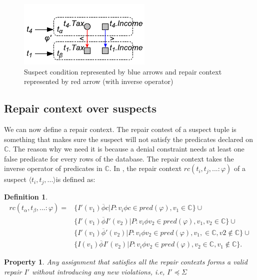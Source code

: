 \documentclass[letterpaper, 12pt]{report}
\newtheorem{mydef}{Definition}
\newtheorem{myprop}{Property}
\begin{document}
\begin{figure}
	\centering
	\includegraphics[scale=1]{img/fig3}
	\caption{\label{fig3}Suspect condition represented by blue arrows and repair context represented by red arrow (with inverse operator)}
\end{figure}

\subsection{Repair context over suspects}

We can now define a repair context. The repair contest of a suspect tuple is something that makes sure the suspect will not satisfy the predicates declared on $\mathbb{C}$. The reason why we need it is because a denial constraint needs at least one false predicate for every rows of the database. The repair context takes the inverse operator of predicates in $\mathbb{C}$. In \cite{main}, the repair context $rc(t_i,t_j,...:\varphi)$ of a suspect $\langle t_i,t_j,... \rangle $is defined as:

\begin{mydef}
	\begin{displaymath}
	\begin{split}
	rc(t_\alpha,t_\beta,...:\varphi) =
	&\{ I'(v_1)\overline{\phi}c|P : v_i\phi c \in pred(\varphi),v_1 \in \mathbb{C}\}\cup\\
	&\{I'(v_1)\overline{\phi} I'(v_2)|P : v_i\phi v_2 \in pred(\varphi),v_1,v_2 \in \mathbb{C}\}\cup\\
	&\{I'(v_1)\overline{\phi} '(v_2)|P : v_i\phi v_2 \in pred(\varphi),v_1,\in \mathbb{C},v2 \not\in \mathbb{C}\}\cup\\
	&\{I(v_1)\overline{\phi} I'(v_2)|P : v_i\phi v_2 \in pred(\varphi),v_2 \in \mathbb{C},v_1 \not\in \mathbb{C}\}.
	\end{split}
	\end{displaymath}
\end{mydef}

\begin{myprop}
Any assignment that satisfies all the repair contexts forms a valid repair $I'$ without introducing any new violations, i.e, $I' \preceq \Sigma$
\end{myprop}
\end{document}
